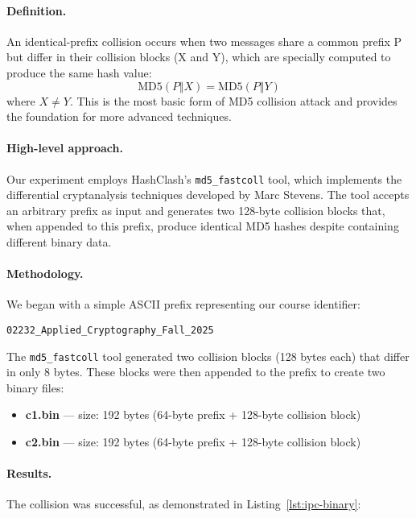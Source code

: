 \documentclass[runningheads]{llncs}
\begin{document}
    \paragraph{Definition.}
    An identical-prefix collision occurs when two messages share a common prefix P but differ in their collision blocks (X and Y), which are specially computed to produce the same hash value:
    \[
        \mathrm{MD5}(P\Vert X)=\mathrm{MD5}(P\Vert Y)
    \]
    where $X \neq Y$. This is the most basic form of MD5 collision attack and provides the foundation for more advanced techniques.

    \paragraph{High-level approach.}
    Our experiment employs HashClash's \texttt{md5\_fastcoll} tool, which implements the differential cryptanalysis techniques developed by Marc Stevens. The tool accepts an arbitrary prefix as input and generates two 128-byte collision blocks that, when appended to this prefix, produce identical MD5 hashes despite containing different binary data.

    \paragraph{Methodology.}
    We began with a simple ASCII prefix representing our course identifier:
    \begin{lstlisting}[style=textblock]
02232_Applied_Cryptography_Fall_2025
    \end{lstlisting}

    The \texttt{md5\_fastcoll} tool generated two collision blocks (128 bytes each) that differ in only 8 bytes. These blocks were then appended to the prefix to create two binary files:
    \begin{itemize}
        \item \textbf{c1.bin} — size: 192 bytes (64-byte prefix + 128-byte collision block)
        \item \textbf{c2.bin} — size: 192 bytes (64-byte prefix + 128-byte collision block)
    \end{itemize}

    \paragraph{Results.}
    The collision was successful, as demonstrated in Listing~\ref{lst:ipc-binary}:
\end{document}
